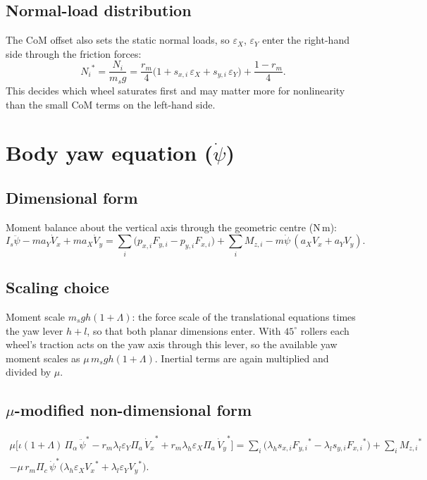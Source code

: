 \documentclass[11pt]{article}
\newcommand{\st}[1]{{#1}^{*}}
\begin{document}
\subsection{Normal-load distribution}
The CoM offset also sets the static normal loads, so $\varepsilon_X$,
$\varepsilon_Y$ enter the right-hand side through the friction forces:
\begin{equation}
\st{N_i} = \frac{N_i}{m_s g}
 = \frac{r_m}{4}\big(1 + s_{x,i}\,\varepsilon_X + s_{y,i}\,\varepsilon_Y\big)
 + \frac{1-r_m}{4}.
\end{equation}
This decides which wheel saturates first and may matter more for nonlinearity
than the small CoM terms on the left-hand side.

\section{Body yaw equation ($\dot\psi$)}

\subsection{Dimensional form}
Moment balance about the vertical axis through the geometric centre (N\,m):
\begin{equation}
I_s\ddot\psi - m a_Y\dot V_x + m a_X\dot V_y
 = \textstyle\sum_i \big(p_{x,i}F_{y,i} - p_{y,i}F_{x,i}\big)
 + \sum_i M_{z,i}
 - m\dot\psi\,(a_X V_x + a_Y V_y). \label{eq:yaw}
\end{equation}

\subsection{Scaling choice}
Moment scale $m_s g h(1+\Lambda)$: the force scale of the translational equations
times the yaw lever $h + l$, so that both planar dimensions enter. With
$45^\circ$ rollers each wheel's traction acts on the yaw axis through this lever,
so the available yaw moment scales as $\mu\,m_s g h(1+\Lambda)$. Inertial terms
are again multiplied and divided by $\mu$.

\subsection{$\mu$-modified non-dimensional form}
\begin{multline}
\mu\Big[\iota(1+\Lambda)\,\Pi_\alpha\,\st{\ddot\psi}
 - r_m\lambda_l\varepsilon_Y\Pi_a\,\st{\dot V_x}
 + r_m\lambda_h\varepsilon_X\Pi_a\,\st{\dot V_y}\Big]
 = \textstyle\sum_i\big(\lambda_h s_{x,i}\st{F_{y,i}} - \lambda_l s_{y,i}\st{F_{x,i}}\big)
 + \sum_i \st{M_{z,i}} \\
 - \mu\,r_m\Pi_c\,\st{\dot\psi}\big(\lambda_h\varepsilon_X\st{V_x} + \lambda_l\varepsilon_Y\st{V_y}\big).
 \label{eq:yawnd}
\end{multline}
\end{document}
